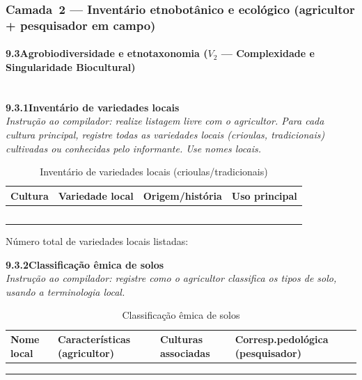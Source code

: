 \subsubsection*{Camada~2 --- Inventário etnobotânico e ecológico (agricultor + pesquisador em campo)}

\paragraph{9.3\quad Agrobiodiversidade e etnotaxonomia ($V_2$ --- Complexidade e Singularidade Biocultural)}~\\[4pt]

\noindent\textbf{9.3.1\quad Inventário de variedades locais}\\[2pt]
\textit{Instrução ao compilador: realize listagem livre com o agricultor. Para cada cultura principal, registre todas as variedades locais (crioulas, tradicionais) cultivadas ou conhecidas pelo informante. Use nomes locais.}

\begin{table}[htbp]
\centering\small
\caption{Inventário de variedades locais (crioulas/tradicionais)}
\label{tab:app_variedades}
\begin{tabular}{p{3.2cm}p{3.5cm}p{3.5cm}p{2.5cm}}
\toprule
\textbf{Cultura} & \textbf{Variedade local} & \textbf{Origem/história} & \textbf{Uso principal} \\
\midrule
& & & \\
& & & \\
& & & \\
& & & \\
& & & \\
\bottomrule
\end{tabular}
\end{table}

\noindent Número total de variedades locais listadas: \dotfill

\medskip\noindent\textbf{9.3.2\quad Classificação êmica de solos}\\[2pt]
\textit{Instrução ao compilador: registre como o agricultor classifica os tipos de solo, usando a terminologia local.}

\begin{table}[htbp]
\centering\small
\caption{Classificação êmica de solos}
\label{tab:app_solos_emico}
\begin{tabular}{p{2.5cm}p{3.0cm}p{3.0cm}p{3.5cm}}
\toprule
\textbf{Nome local} & \textbf{Características (agricultor)} & \textbf{Culturas associadas} & \textbf{Corresp.\@ pedológica (pesquisador)} \\
\midrule
& & & \\
& & & \\
& & & \\
\bottomrule
\end{tabular}
\end{table}

